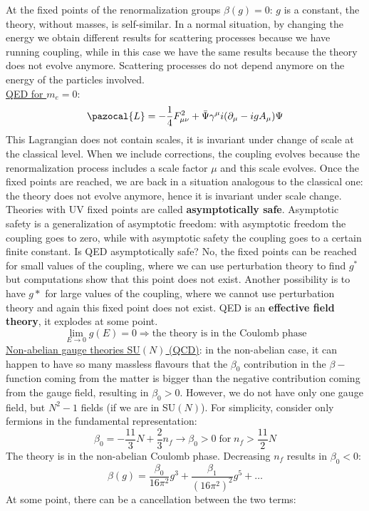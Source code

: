 \documentclass[../main.tex]{subfiles}
\begin{document}
At the fixed points of the renormalization groups $\beta(g)=0$: $g$ is a constant, the theory, without masses, is self-similar. In a normal situation, by changing the energy we obtain different results for scattering processes because we have running coupling, while in this case we have the same results because the theory does not evolve anymore. Scattering processes do not depend anymore on the energy of the particles involved.\\
\underline{QED for $m_e=0$}:
\[
\pazocal{L}=-\frac{1}{4}F_{\mu\nu}^2+\Bar{\Psi}\gamma^\mu i(\partial_\mu-igA_\mu)\Psi
\]
This Lagrangian does not contain scales, it is invariant under change of scale at the classical level. When we include corrections, the coupling evolves because the renormalization process includes a scale factor $\mu$ and this scale evolves. Once the fixed points are reached, we are back in a situation analogous to the classical one: the theory does not evolve anymore, hence it is invariant under scale change. Theories with UV fixed points are called \textbf{asymptotically safe}. Asymptotic safety is a generalization of asymptotic freedom: with asymptotic freedom the coupling goes to zero, while with asymptotic safety the coupling goes to a certain finite constant. Is QED asymptotically safe? No, the fixed points can be reached for small values of the coupling, where we can use perturbation theory to find $g^*$ but computations show that this point does not exist. Another possibility is to have $g*$ for large values of the coupling, where we cannot use perturbation theory and again this fixed point does not exist. QED is an \textbf{effective field theory}, it explodes at some point.
\[
\lim_{E\to0}g(E)=0\Rightarrow\text{the theory is in the Coulomb phase}
\]
\underline{Non-abelian gauge theories SU$(N)$ (QCD)}: in the non-abelian case, it can happen to have so many massless flavours that the $\beta_0$ contribution in the $\beta-$function coming from the matter is bigger than the negative contribution coming from the gauge field, resulting in $\beta_0>0$. However, we do not have only one gauge field, but $N^2-1$ fields (if we are in SU$(N)$). For simplicity, consider only fermions in the fundamental representation:
\[
\beta_0=-\frac{11}{3}N+\frac{2}{3}n_f\to\beta_0>0 \;\text{for}\;n_f>\frac{11}{2}N
\]
The theory is in the non-abelian Coulomb phase. Decreasing $n_f$ results in $\beta_0<0$:
\[
\beta(g)=\frac{\beta_0}{16\pi^2}g^3+\frac{\beta_1}{(16\pi^2)^2}g^5+\dots
\]
At some point, there can be a cancellation between the two terms:
\end{document}
